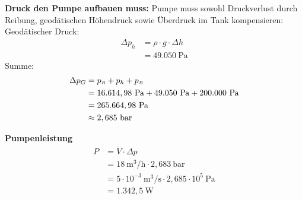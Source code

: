 \documentclass[a4paper,11pt]{article}
\begin{document}
{\pagebreak
\textbf{Druck den Pumpe aufbauen muss:}
\pp 
Pumpe muss sowohl Druckverlust durch Reibung, geodätischen Höhendruck sowie Überdruck im Tank kompensieren: 
\pp
Geodätischer Druck:
\begin{align*}
\Delta p_{h} &= \rho \cdot g \cdot \Delta h \\
&= 49.050~\text{Pa}
\end{align*}
Summe:
\begin{align*}
\Delta p_{G} &= p_{\mathsmaller{R}} + p_{h} + p_{\mathsmaller{B}} \\
&= 16.614,98~\text{Pa} + 49.050~\text{Pa} + 200.000 ~\text{Pa} \\
&= 265.664,98~\text{Pa} \\
&\approx 2,685~\text{bar}
\end{align*}

\pp
\textbf{Pumpenleistung}
\begin{align*}
P &= \dot{V} \cdot \Delta p \\
 &= 18 ~\text{m$^3$/h}  \cdot 2,683 ~\text{bar} \\
 &= 5 \cdot 10^{-3}  ~\text{m$^3$/s} \cdot 2,685 \cdot 10^{5}~\text{Pa}\\
 &= 1.342,5~\text{W}
\end{align*}
}

\else
\fi


%
\end{document}
